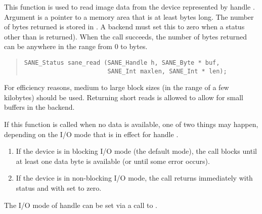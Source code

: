 \documentclass[11pt,DVIps]{report}
\begin{document}
This function is used to read image data from the device represented
by handle .  Argument  is a pointer to a memory area
that is at least  bytes long.  The number of bytes
returned is stored in .  A backend must set this to zero
when a status other than  is returned).
When the call succeeds, the number of bytes returned can be anywhere in
the range from 0 to  bytes.
\begin{quote}
\begin{verbatim}
SANE_Status sane_read (SANE_Handle h, SANE_Byte * buf,
                       SANE_Int maxlen, SANE_Int * len);
\end{verbatim}
\end{quote}
\begin{changebar}
For efficiency reasons, medium to large 
block sizes (in the range of a few kilobytes) should be used. 
Returning short reads is allowed to allow for small buffers 
in the backend. 
\end{changebar}
If this function is called when no data is available, one of two
things may happen, depending on the I/O mode that is in effect for
handle .
\begin{enumerate}
\item If the device is in blocking I/O mode (the default mode), the
  call blocks until at least one data byte is available (or until some
  error occurs).

\item If the device is in non-blocking I/O mode, the call returns
  immediately with status  and with
   set to zero.
\end{enumerate}
The I/O mode of handle  can be set via a call to
.
\end{document}
